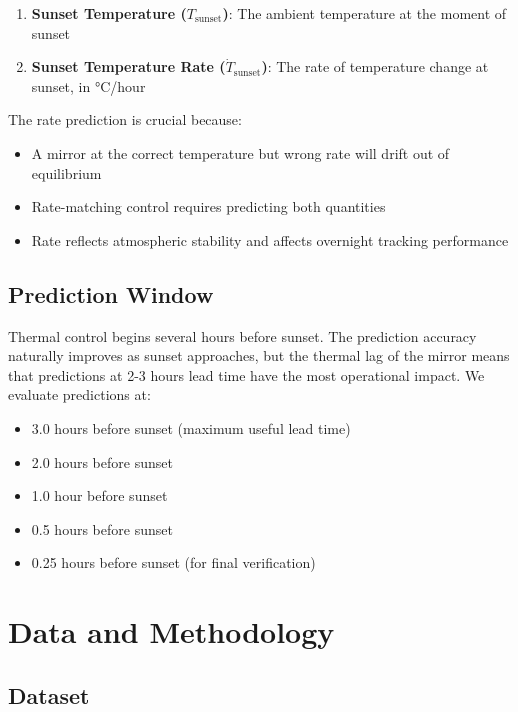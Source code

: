 \documentclass[11pt,letterpaper]{article}
\begin{document}
\begin{enumerate}
    \item \textbf{Sunset Temperature ($T_\text{sunset}$)}: The ambient temperature at the moment of sunset
    \item \textbf{Sunset Temperature Rate ($\dot{T}_\text{sunset}$)}: The rate of temperature change at sunset, in °C/hour
\end{enumerate}

The rate prediction is crucial because:
\begin{itemize}
    \item A mirror at the correct temperature but wrong rate will drift out of equilibrium
    \item Rate-matching control requires predicting both quantities
    \item Rate reflects atmospheric stability and affects overnight tracking performance
\end{itemize}

\subsection{Prediction Window}

Thermal control begins several hours before sunset. The prediction accuracy naturally improves as sunset approaches, but the thermal lag of the mirror means that predictions at 2-3 hours lead time have the most operational impact. We evaluate predictions at:

\begin{itemize}
    \item 3.0 hours before sunset (maximum useful lead time)
    \item 2.0 hours before sunset
    \item 1.0 hour before sunset
    \item 0.5 hours before sunset
    \item 0.25 hours before sunset (for final verification)
\end{itemize}

\section{Data and Methodology}

\subsection{Dataset}
\end{document}
